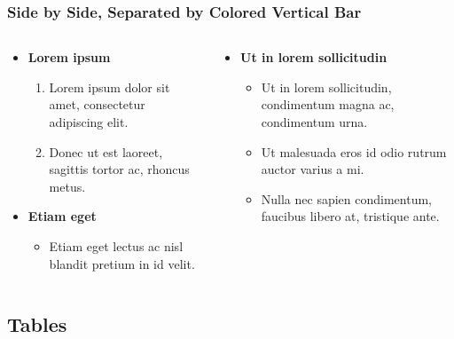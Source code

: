 \documentclass[english,hangout]{FrankfurtUAS}
\begin{document}
\begin{frame}
\frametitle{Side by Side, Separated by Colored Vertical Bar}
\begin{columns}[onlytextwidth]
\begin{column}{.5\textwidth}
\begin{itemize}
\item \textbf{Lorem ipsum} 
\begin{enumerate}
\item Lorem ipsum dolor sit amet, consectetur adipiscing elit.
\item Donec ut est laoreet, sagittis tortor ac, rhoncus metus.
\end{enumerate}
\item \textbf{Etiam eget} 
\begin{itemize}
\item Etiam eget lectus ac nisl blandit pretium in id velit.
\end{itemize}
\end{itemize}
\end{column}
\begin{column}{.5\textwidth}
\begin{itemize}
\item \textbf{Ut in lorem sollicitudin}
\begin{itemize}
\item Ut in lorem sollicitudin, condimentum magna ac, condimentum urna.
\item Ut malesuada eros id odio rutrum auctor varius a mi.
\item Nulla nec sapien condimentum, faucibus libero at, tristique ante.
\end{itemize}
\end{itemize}
\end{column}
\end{columns}
\end{frame}



\subsection{Tables}
\end{document}
